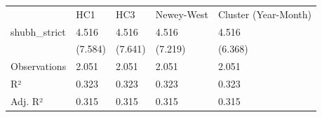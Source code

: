 \begin{tabular}{lllll}
& HC1 & HC3 & Newey-West & Cluster (Year-Month) \\
shubh\_strict & \num{4.516} & \num{4.516} & \num{4.516} & \num{4.516} \\
& (\num{7.584}) & (\num{7.641}) & (\num{7.219}) & (\num{6.368}) \\
Observations & \num{2,051} & \num{2,051} & \num{2,051} & \num{2,051} \\
R² & \num{0.323} & \num{0.323} & \num{0.323} & \num{0.323} \\
Adj. R² & \num{0.315} & \num{0.315} & \num{0.315} & \num{0.315} \\
\end{tabular}
